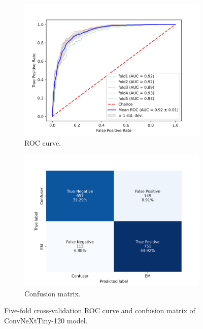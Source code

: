 \begin{figure}[h!]
	\centering
	\begin{subfigure}[b]{0.49\textwidth}
		\centering
		\includegraphics[width=\textwidth,keepaspectratio]{images/Supplement4/ConvNextTinyHAMIMGCOPYWEIGHTEC120_MultiROC.png}
		\caption{ROC curve.}
	\end{subfigure}
	\hfill
	\begin{subfigure}[b]{0.49\textwidth}
		\centering
		\includegraphics[width=\textwidth,keepaspectratio]{images/Supplement4/ConvNextTinyHAMIMGCOPYWEIGHTEC120_Combined_CM.png}
		\caption{Confusion matrix.}
	\end{subfigure}
	\caption{Five-fold cross-validation ROC curve and confusion matrix of ConvNeXtTiny-120 model.}
\end{figure}